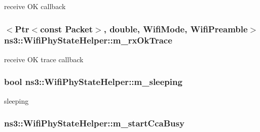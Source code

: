 receive OK callback 

\subsubsection[{\texorpdfstring{m\+\_\+rx\+Ok\+Trace}{m_rxOkTrace}}]{$<${\bf Ptr}$<$const {\bf Packet}$>$, double, {\bf Wifi\+Mode}, {\bf Wifi\+Preamble}$>$ ns3\+::\+Wifi\+Phy\+State\+Helper\+::m\+\_\+rx\+Ok\+Trace\hspace{0.3cm}{\ttfamily [private]}}\hypertarget{classns3_1_1WifiPhyStateHelper_a97095d8d63198458c97879945be8c013}{}\label{classns3_1_1WifiPhyStateHelper_a97095d8d63198458c97879945be8c013}


receive OK trace callback 

\subsubsection[{\texorpdfstring{m\+\_\+sleeping}{m_sleeping}}]{\setlength{\rightskip}{0pt plus 5cm}bool ns3\+::\+Wifi\+Phy\+State\+Helper\+::m\+\_\+sleeping\hspace{0.3cm}{\ttfamily [private]}}\hypertarget{classns3_1_1WifiPhyStateHelper_ad2de713d57e8a1c73fb1b74bf5e9883e}{}\label{classns3_1_1WifiPhyStateHelper_ad2de713d57e8a1c73fb1b74bf5e9883e}


sleeping 

\subsubsection[{\texorpdfstring{m\+\_\+start\+Cca\+Busy}{m_startCcaBusy}}]{ ns3\+::\+Wifi\+Phy\+State\+Helper\+::m\+\_\+start\+Cca\+Busy\hspace{0.3cm}{\ttfamily [private]}}\hypertarget{classns3_1_1WifiPhyStateHelper_ac1fbac45353b977a8c2637e2ba474c1b}{}\label{classns3_1_1WifiPhyStateHelper_ac1fbac45353b977a8c2637e2ba474c1b}


